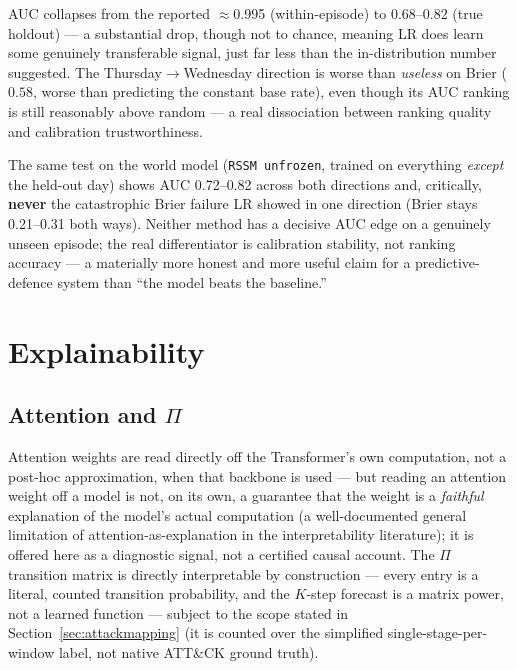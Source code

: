 \documentclass[11pt]{article}
\newcommand{\code}[1]{\texttt{#1}}
\begin{document}
\noindent AUC collapses from the reported $\approx$0.995 (within-episode) to 0.68--0.82 (true
holdout) --- a substantial drop, though not to chance, meaning LR does learn some genuinely
transferable signal, just far less than the in-distribution number suggested. The
Thursday$\to$Wednesday direction is worse than \emph{useless} on Brier ($0.58$, worse than
predicting the constant base rate), even though its AUC ranking is still reasonably above random
--- a real dissociation between ranking quality and calibration trustworthiness.

The same test on the world model (\code{RSSM unfrozen}, trained on everything \emph{except} the
held-out day) shows AUC 0.72--0.82 across both directions and, critically, \textbf{never} the
catastrophic Brier failure LR showed in one direction (Brier stays 0.21--0.31 both ways). Neither
method has a decisive AUC edge on a genuinely unseen episode; the real differentiator is
calibration stability, not ranking accuracy --- a materially more honest and more useful claim
for a predictive-defence system than ``the model beats the baseline.''

\section{Explainability}\label{sec:explain}

\subsection{Attention and $\Pi$}

Attention weights are read directly off the Transformer's own computation, not a post-hoc
approximation, when that backbone is used --- but reading an attention weight off a model is
not, on its own, a guarantee that the weight is a \emph{faithful} explanation of the model's
actual computation (a well-documented general limitation of attention-as-explanation in the
interpretability literature); it is offered here as a diagnostic signal, not a certified
causal account. The $\Pi$ transition matrix is directly interpretable by construction ---
every entry is a literal, counted transition probability, and the $K$-step forecast is a
matrix power, not a learned function --- subject to the scope stated in
Section~\ref{sec:attackmapping} (it is counted over the simplified single-stage-per-window
label, not native ATT\&CK ground truth).
\end{document}
